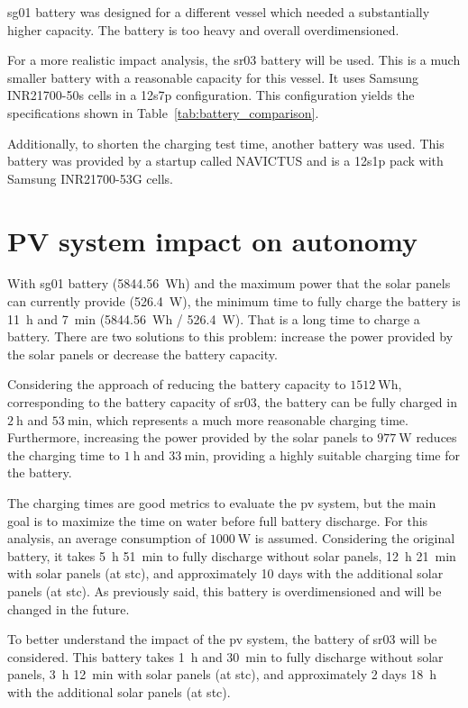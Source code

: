 \ac{sg01} battery was designed for a different vessel which needed a substantially higher capacity. The battery is too heavy and overall overdimensioned. 

For a more realistic impact analysis, the \ac{sr03} battery will be used. This is a much smaller battery with a reasonable capacity for this vessel. It uses Samsung INR21700-50s cells in a 12s7p configuration. This configuration yields the specifications shown in Table~\ref{tab:battery_comparison}.

Additionally, to shorten the charging test time, another battery was used. This battery was provided by a startup called NAVICTUS and is a 12s1p pack with Samsung INR21700-53G cells.
\section{PV system impact on autonomy}

With \ac{sg01} battery (5844.56~Wh) and the maximum power that the solar panels can currently provide (526.4~W), the minimum time to fully charge the battery is 11~h and 7~min (5844.56~Wh / 526.4~W). That is a long time to charge a battery. There are two solutions to this problem: increase the power provided by the solar panels or decrease the battery capacity.

Considering the approach of reducing the battery capacity to $1512~\mathrm{Wh}$, corresponding to the battery capacity of \acs{sr03}, the battery can be fully charged in $2~\mathrm{h}$ and $53~\mathrm{min}$, which represents a much more reasonable charging time. Furthermore, increasing the power provided by the solar panels to $977~\mathrm{W}$ reduces the charging time to $1~\mathrm{h}$ and $33~\mathrm{min}$, providing a highly suitable charging time for the battery.

The charging times are good metrics to evaluate the \ac{pv} system, but the main goal is to maximize the time on water before full battery discharge. For this analysis, an average consumption of $1000~\mathrm{W}$ is assumed. Considering the original battery, it takes 5~h 51~min to fully discharge without solar panels, 12~h 21~min with solar panels (at \ac{stc}), and approximately 10 days with the additional solar panels (at \ac{stc}). As previously said, this battery is overdimensioned and will be changed in the future.

To better understand the impact of the \ac{pv} system, the battery of \acs{sr03} will be considered. This battery takes 1~h and 30~min to fully discharge without solar panels, 3~h 12~min with solar panels (at \ac{stc}), and approximately 2 days 18~h with the additional solar panels (at \ac{stc}). 

